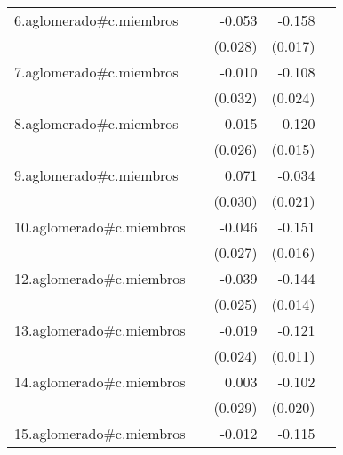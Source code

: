 {\begin{longtable}{l*{4}{D{.}{.}{-1}}}
\addlinespace
6.aglomerado#c.miembros&                     &      -0.053         &      -0.158\sym{***}&                     \\
            &                     &     (0.028)         &     (0.017)         &                     \\
\addlinespace
7.aglomerado#c.miembros&                     &      -0.010         &      -0.108\sym{***}&                     \\
            &                     &     (0.032)         &     (0.024)         &                     \\
\addlinespace
8.aglomerado#c.miembros&                     &      -0.015         &      -0.120\sym{***}&                     \\
            &                     &     (0.026)         &     (0.015)         &                     \\
\addlinespace
9.aglomerado#c.miembros&                     &       0.071\sym{*}  &      -0.034         &                     \\
            &                     &     (0.030)         &     (0.021)         &                     \\
\addlinespace
10.aglomerado#c.miembros&                     &      -0.046         &      -0.151\sym{***}&                     \\
            &                     &     (0.027)         &     (0.016)         &                     \\
\addlinespace
12.aglomerado#c.miembros&                     &      -0.039         &      -0.144\sym{***}&                     \\
            &                     &     (0.025)         &     (0.014)         &                     \\
\addlinespace
13.aglomerado#c.miembros&                     &      -0.019         &      -0.121\sym{***}&                     \\
            &                     &     (0.024)         &     (0.011)         &                     \\
\addlinespace
14.aglomerado#c.miembros&                     &       0.003         &      -0.102\sym{***}&                     \\
            &                     &     (0.029)         &     (0.020)         &                     \\
\addlinespace
15.aglomerado#c.miembros&                     &      -0.012         &      -0.115\sym{***}&                     \\

\end{longtable}}
